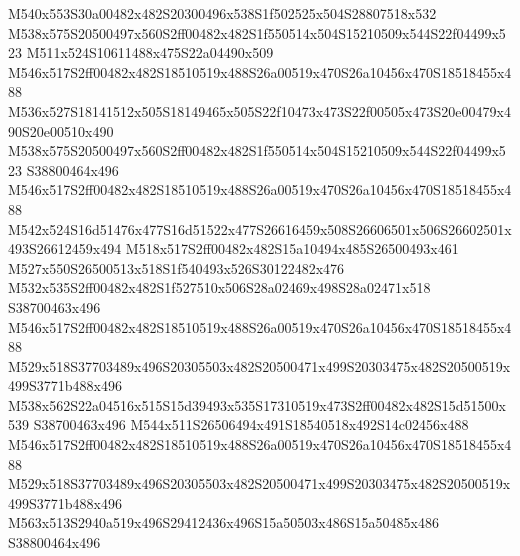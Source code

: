 \documentclass{article}
\begin{document}
\begin{multicols}{2}


M540x553S30a00482x482S20300496x538S1f502525x504S28807518x532 M538x575S20500497x560S2ff00482x482S1f550514x504S15210509x544S22f04499x523 M511x524S10611488x475S22a04490x509 M546x517S2ff00482x482S18510519x488S26a00519x470S26a10456x470S18518455x488 M536x527S18141512x505S18149465x505S22f10473x473S22f00505x473S20e00479x490S20e00510x490 M538x575S20500497x560S2ff00482x482S1f550514x504S15210509x544S22f04499x523 S38800464x496 M546x517S2ff00482x482S18510519x488S26a00519x470S26a10456x470S18518455x488 M542x524S16d51476x477S16d51522x477S26616459x508S26606501x506S26602501x493S26612459x494 M518x517S2ff00482x482S15a10494x485S26500493x461 M527x550S26500513x518S1f540493x526S30122482x476 M532x535S2ff00482x482S1f527510x506S28a02469x498S28a02471x518 S38700463x496 M546x517S2ff00482x482S18510519x488S26a00519x470S26a10456x470S18518455x488 M529x518S37703489x496S20305503x482S20500471x499S20303475x482S20500519x499S3771b488x496 M538x562S22a04516x515S15d39493x535S17310519x473S2ff00482x482S15d51500x539 S38700463x496 M544x511S26506494x491S18540518x492S14c02456x488 M546x517S2ff00482x482S18510519x488S26a00519x470S26a10456x470S18518455x488 M529x518S37703489x496S20305503x482S20500471x499S20303475x482S20500519x499S3771b488x496 M563x513S2940a519x496S29412436x496S15a50503x486S15a50485x486 S38800464x496







\end{multicols}
\end{document}

